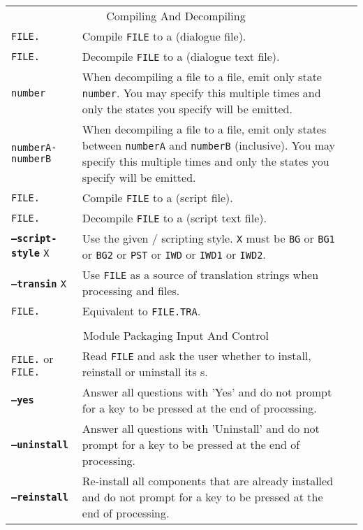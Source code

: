 \documentclass{article}
\def\ttref#1{\ahrefloc{#1}{\tt #1}}
\def\DEFINE#1{{\tt \bf #1}\label{#1}\index{#1}}
\def\t#1{{\tt #1}}
\begin{document}
\begin{tabular}{lp{10in}|p{10in}}
\multicolumn{2}{c}{ \color{red} Compiling And Decompiling } \\
\tt{FILE.}\ttref{D}   & Compile \t{FILE} to a \ttref{DLG} (dialogue file). \\
\tt{FILE.}\ttref{DLG} & Decompile \t{FILE} to a \ttref{D} (dialogue text file). \\
\t{number}            & When decompiling a \ttref{DLG} file to a \ttref{D}
file, emit only state \t{number}. You may specify this multiple times and
only the states you specify will be emitted. \\
\t{numberA}\t{-}\t{numberB} &  When decompiling a \ttref{DLG} file to a
\ttref{D} file, emit only states between \t{numberA} and \t{numberB}
(inclusive). You may specify this multiple times and only the states you
specify will be emitted. \\
\tt{FILE.}\ttref{BAF} & Compile \t{FILE} to a \ttref{BCS} (script file).  \\
\tt{FILE.}\ttref{BCS} & Decompile \t{FILE} to a \ttref{BAF} (script text file).  \\
\DEFINE{--script-style} \t{X} & Use the given \ttref{BAF}/\ttref{BCS}
scripting style. \t{X} must be \t{BG} or \t{BG1} or \t{BG2} or \t{PST} or \t{IWD} or \t{IWD1}
or \t{IWD2}. \\
\DEFINE{--transin} \t{X} &
Use {\tt FILE} as a source of translation strings
when processing \ttref{D} and \ttref{BAF} files. \\
\tt{FILE.}\ttref{TRA} & Equivalent to \ttref{--transin} \t{FILE.TRA}. \\
\\
\multicolumn{2}{c}{ \color{red} Module Packaging Input And Control} \\
{\tt FILE.}\ttref{TP}  or
\tt{FILE.}\ttref{TP2} & Read {\tt FILE} and ask the user whether to install,
reinstall or uninstall its \ttref{TP2} \ttref{Component}s. \\
\DEFINE{--yes} & Answer all \ttref{TP2} questions with 'Yes' and do not
prompt for a key to be pressed at the end of \ttref{TP2} processing. \\
\DEFINE{--uninstall}  	& Answer all \ttref{TP2} questions with 'Uninstall'
and do not prompt for a key to be pressed at the end of \ttref{TP2}
processing. \\
\DEFINE{--reinstall}  	& Re-install all \ttref{TP2} components that are
already installed and do not prompt for a key to be pressed at the end of
\ttref{TP2} processing. \\

\end{tabular}
\end{document}
